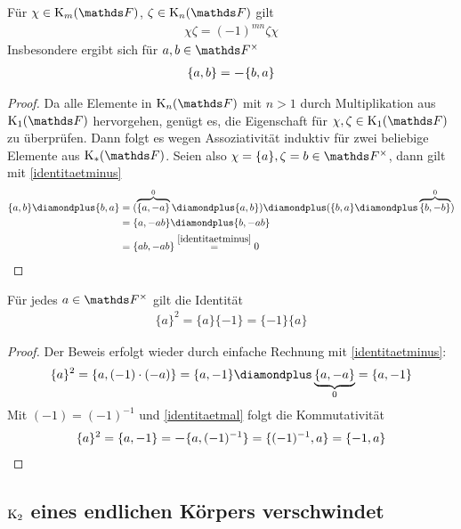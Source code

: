 \documentclass[ngerman,fontsize=11pt, paper=a4, parskip=half, titlepage=true, toc=bib]{scrartcl}
\begin{document}
\begin{Lem}\label{identitaetmal}
  Für $\chi\in\K_m(\F)$, $\zeta\in\K_n(\F)$ gilt
  \begin{gather*}
    \chi\zeta=(-1)^{mn}\zeta\chi
  \end{gather*}
  Insbesondere ergibt sich für $a,b\in \Fx$
  \begin{gather*}
    \{a,b\}= \boldsymbol -\{b,a\}
  \end{gather*}
  \begin{proof}
    Da alle Elemente in $\KnF$ mit $n>1$ durch Multiplikation aus
    $\KoF$ hervorgehen, genügt es, die Eigenschaft für
    $\chi,\zeta\in\KoF$ zu überprüfen. Dann folgt es wegen
    Assoziativität induktiv für zwei beliebige Elemente aus $\KF$.
    Seien also $\chi=\{a\},\zeta=b\in\Fx$, dann gilt mit \ref{identitaetminus}
    \begin{align*}
      \{a,b\}\p \{b,a\} 
      &= (\overbrace{\{a,-a\}}^{0} \p \{a,b\} )
        \p (\{b,a\} \p \overbrace{\{b,-b\}}^{0} ) \\
      &= \{ a,-ab \} \p \{b, -ab\}\\
      &= \{ ab, -ab\} \overset{\ref{identitaetminus}}{=} 0
    \end{align*}
  \end{proof}
\end{Lem}

\begin{Lem}\label{identitaetquadrat}
  Für jedes $a\in \Fx$ gilt die Identität
  \begin{gather}
    \{a\}^2 = \{a\}\{-1\} = \{-1\}\{a\}
  \end{gather}
  \begin{proof}
    Der Beweis erfolgt wieder durch einfache Rechnung mit
    \ref{identitaetminus}:
    \begin{gather*}
      \{a\}^2 = \{a,(-1)\cdot (-a)\} 
      = \{a,-1\}\p\underbrace{\{a,-a\}}_{0} = \{a,-1\}
    \end{gather*}
    Mit $(-1)=(-1)^{-1}$ und \ref{identitaetmal} folgt die Kommutativität
    \begin{gather*}
      \{a\}^2 = \{a,-1\}= \boldsymbol -\{a,(-1)^{-1}\} = \{(-1)^{-1},a\} = \{-1,a\}
    \end{gather*}
  \end{proof}
\end{Lem}


\subsection{$\operatorname{K}_2$ eines endlichen Körpers verschwindet}
\end{document}
